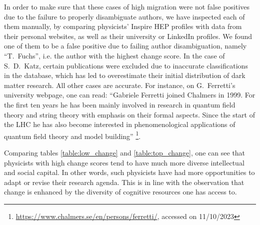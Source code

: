 \documentclass{article}
\begin{document}
In order to make sure that these cases of high migration were not false positives due to the failure to properly disambiguate authors, we have inspected each of them manually, by comparing physicists' Inspire HEP profiles with data from their personal websites, as well as their university or LinkedIn profiles. We found one of them to be a false positive due to failing author disambiguation, namely ``T.~Fuchs'', i.e. the author with the highest change score. In the case of S.~D.~Katz, certain publications were excluded due to inaccurate classifications in the database, which has led to overestimate their initial distribution of dark matter research. All other cases are accurate.
For instance, on G.~Ferretti's university webpage, one can read: ``Gabriele Ferretti joined Chalmers in 1999. For the first ten years he has been mainly involved in research in quantum field theory and string theory with emphasis on their formal aspects. Since the start of the LHC he has also become interested in phenomenological applications of quantum field theory and model building'' \footnote{\url{https://www.chalmers.se/en/persons/ferretti/}, accessed on 11/10/2023}.

Comparing tables \ref{table:low_change} and \ref{table:top_change}, one can see that physicists with high change scores tend to have much more diverse intellectual and social capital. In other words, such physicists have had more opportunities to adapt or revise their research agenda. This is in line with the observation that change is enhanced by the diversity of cognitive resources one has access to.

\fontsize{6}{7}\selectfont\normalsize
\fontsize{6}{7}\selectfont\normalsize



\end{document}
